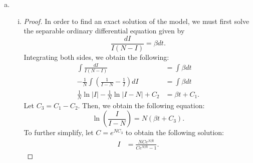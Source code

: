 \documentclass[12pt]{article}
\begin{document}
\begin{enumerate}[(a)]
{\begin{proof}
In order to prove global asymptotic stability, we observe that as the magnitude of $I$ gets arbitrarily large, $L(I)$ also gets arbitrarily large. In other words, $L(I) \to \infty$ as $|I| \to \infty$, and $L$ is thus radially unbounded. Since $L(I)$ is radially unbounded, and $L(I) < 0$ $\forall \ I \in \Delta \setminus \{I_\ast\}$, it follows by LaSalle's Invariance Principle that the endemic equilibrium is globally asymptotically stable.
    \end{proof}
  }
  
\item \SIanalQb
  \begin{enumerate}[(i)]
  \item \SIanalQbi
    
    {\color{blue}
      \begin{proof}
        In order to find an exact solution of the model, we must first solve the separable ordinary differential equation given by
\begin{equation*}
\frac{dI}{I(N-I)} = \beta dt.
\end{equation*}
Integrating both sides, we obtain the following:
\begin{equation*}
\begin{aligned}
\int \frac{dI}{I(N-I)} &= \int \beta dt \\
- \frac{1}{N} \int \left(\frac{1}{I-N} - \frac{1}{I}\right) dI &= \int \beta dt\\
\frac{1}{N} \ln{|I|} - \frac{1}{N} \ln{|I-N|} + C_2 &= \beta t + C_1.
\end{aligned}
\end{equation*}
Let $C_3 = C_1 - C_2$. Then, we obtain the following equation:
\begin{equation*}
\ln{\left(\frac{I}{I-N}\right)} = N(\beta t + C_3).
\end{equation*}
To further simplify, let $C = e^{NC_3}$ to obtain the following solution:
\begin{equation}\label{genI}
\begin{aligned}
I &= \frac{NCe^{N \beta t}}{Ce^{N \beta t} - 1}.
\end{aligned}
\end{equation}


\end{proof}}
\end{enumerate}
\end{enumerate}
\end{document}
